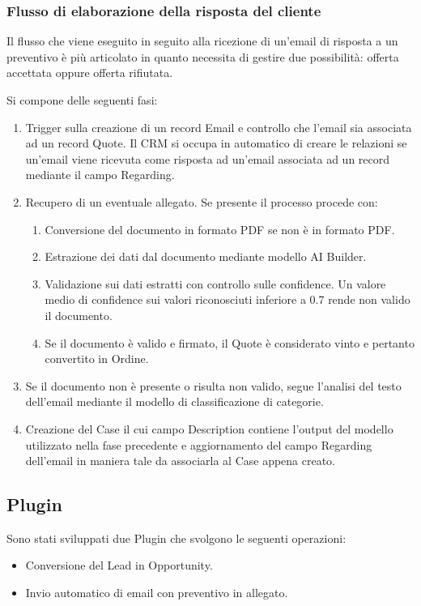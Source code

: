 \subsubsection{Flusso di elaborazione della risposta del cliente}
Il flusso che viene eseguito in seguito alla ricezione di un'email di risposta a un preventivo è più articolato in quanto necessita di gestire due possibilità: offerta accettata oppure offerta rifiutata.

Si compone delle seguenti fasi:
\begin{enumerate}
  \item Trigger sulla creazione di un record Email e controllo che l'email sia associata ad un record Quote. Il CRM si occupa in automatico di creare le relazioni se un'email viene ricevuta come risposta ad un'email associata ad un record mediante il campo Regarding.
  \item Recupero di un eventuale allegato. Se presente il processo procede con:
  \begin{enumerate}
    \item Conversione del documento in formato PDF se non è in formato PDF.
    \item Estrazione dei dati dal documento mediante modello AI Builder.
    \item Validazione sui dati estratti con controllo sulle confidence. Un valore medio di confidence sui valori riconosciuti inferiore a \num{0.7} rende non valido il documento.
    \item Se il documento è valido e firmato, il Quote è considerato vinto e pertanto convertito in Ordine.
  \end{enumerate}
  \item Se il documento non è presente o risulta non valido, segue l'analisi del testo dell'email mediante il modello di classificazione di categorie.
  \item Creazione del Case il cui campo Description contiene l'output del modello utilizzato nella fase precedente e aggiornamento del campo Regarding dell'email in maniera tale da associarla al Case appena creato.
\end{enumerate}

\subsection{Plugin}
Sono stati sviluppati due Plugin che svolgono le seguenti operazioni: 
\begin{itemize}
  \item Conversione del Lead in Opportunity.
  \item Invio automatico di email con preventivo in allegato.
\end{itemize}

